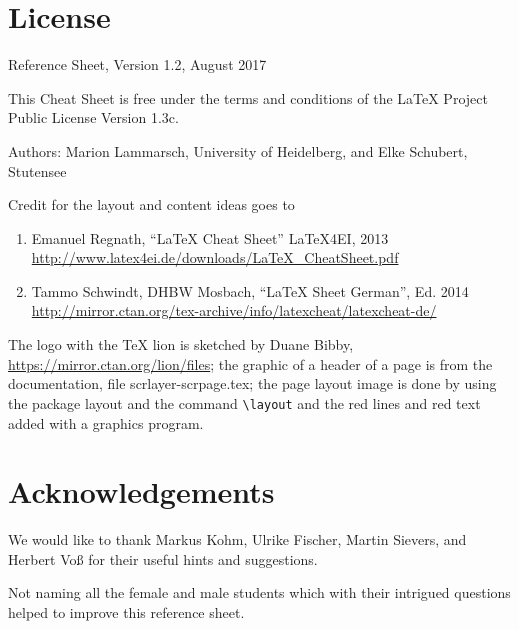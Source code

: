 \documentclass[fontsize=12pt,paper=a4,open=any,parskip=half,
  twoside=false,english]{scrbook}
\begin{document}
\phantom{xx}

\vfill
\section*{License}

Reference Sheet, Version 1.2, August 2017

This Cheat Sheet is free under the terms and conditions of the \LaTeX{} Project Public License Version 1.3c. 

Authors: Marion Lammarsch, University of Heidelberg, and Elke Schubert, Stutensee

Credit for the layout and content ideas goes to 
\begin{enumerate}[label=(\alph*)]
\item Emanuel Regnath, ``\LaTeX{} Cheat Sheet'' \LaTeX4EI, 2013\\  
 \url{http://www.latex4ei.de/downloads/LaTeX_CheatSheet.pdf} 
\item Tammo Schwindt, DHBW Mosbach, ``LaTeX Sheet German'', Ed. 2014\\
 \url{http://mirror.ctan.org/tex-archive/info/latexcheat/latexcheat-de/}
\end{enumerate}

The logo with the \TeX{} lion is sketched by Duane Bibby, \url{https://mirror.ctan.org/lion/files}; 
the graphic of a header of a page is from the \KOMAScript{} documentation, file scrlayer-scrpage.tex;
the page layout image is done by using the package layout 
and the command \texttt{\textbackslash{}layout} and the red lines and red text added with a graphics program.

\section*{Acknowledgements}

We would like to thank Markus Kohm, 
Ulrike Fischer,
Martin Sievers,
and
Herbert Voß
for their useful hints and suggestions. 

Not naming all the female and male students 
which with their intrigued questions helped
to improve this reference sheet.
\end{document}
